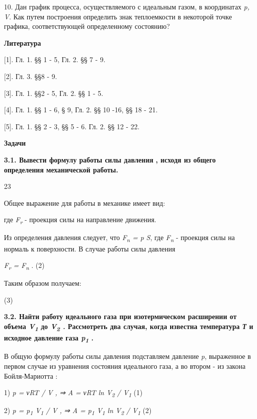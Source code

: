 10. Дан график процесса, осуществляемого с идеальным газом, в
координатах \emph{p, V}. Как путем построения определить знак
теплоемкости в некоторой точке графика, соответствующей определенному
состоянию?

\textbf{Литература}

{[}1{]}. Гл. 1. §§ 1 - 5, Гл. 2. §§ 7 - 9.

{[}2{]}. Гл. 3. §§8 - 9.

{[}3{]}. Гл. 1. §§2 - 5, Гл. 2. §§ 1 - 5.

{[}4{]}. Гл. 1. §§ 1 - 6, § 9, Гл. 2. §§ 10 -16, §§ 18 - 21.

{[}5{]}. Гл. 1. §§ 2 - 3, §§ 5 - 6. Гл. 2. §§ 12 - 22.

\textbf{Задачи}

\textbf{3.1. Вывести формулу работы силы давления}
\textbf{, исходя из общего
определения механической работы.}

23

\solving{}

Общее выражение для работы в механике имеет вид:


где \emph{F\textsubscript{r}} - проекция силы на направление движения.

Из определения давления следует, что \emph{F\textsubscript{n} = p S},
где \emph{F\textsubscript{n}} - проекция силы на нормаль к поверхности.
В случае работы силы давления

\emph{F\textsubscript{r} = F\textsubscript{n}} . (2)

Таким образом получаем:

(3)

\textbf{3.2. Найти работу идеального газа при изотермическом расширении
от объема \emph{V\textsubscript{1}} до \emph{V\textsubscript{2} .}
Рассмотреть два случая, когда известна температура \emph{Т} и исходное
давление газа \emph{p\textsubscript{1}} .}

\solving{}

В общую формулу работы силы давления подставляем давление \emph{p},
выраженное в первом случае из уравнения состояния идеального газа, а во
втором - из закона Бойля-Мариотта :

1) \emph{p = νRT / V ,}%
\emph{⇒ A =
νRT ln V\textsubscript{2} / V\textsubscript{1}} (1)

2) \emph{p = p\textsubscript{1} V\textsubscript{1} / V ,}
\emph{⇒ A = p\textsubscript{1}
V\textsubscript{1} ln V\textsubscript{2} / V\textsubscript{1}} (2)


